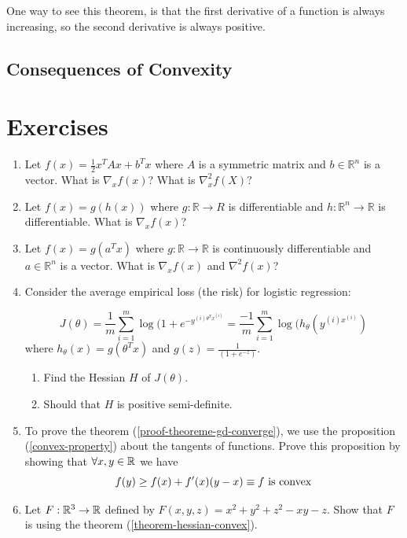 \begin{remark}
    One way to see this theorem, is that the first derivative of a  \cvx{} function is always increasing, so the second derivative is always positive.
\end{remark}


\subsection{Consequences of Convexity}


\section{Exercises}



\begin{enumerate}
    \item Let $f(x) = \frac{1}{2} x^T A x + b^T x$ where $A$ is a symmetric matrix and  $b \in \mathbb R^n$ is a vector. What is $\nabla_x f(x)$? What is $\nabla^2_x f(X)?$
    \item Let $f(x) = g(h(x))$ where $g: \mathbb R \rightarrow R$ is differentiable and $h : \mathbb R^{n} \rightarrow \mathbb R$ is differentiable. What is $\nabla_x f(x)$? 
    \item Let $f(x) = g(a^T x)$ where $g : \mathbb R \rightarrow \mathbb R$ is continuously differentiable and $a \in \mathbb R^n$ is a vector. What is $\nabla_x f(x)$ and $\nabla^2 f(x)$?
    \item Consider the average empirical loss (the risk) for logistic regression: 

    $$J(\theta) = \frac{1}{m} \sum_{i = 1}^m \log(1 + e^{- y^{(i) \theta^T x^{(i)}} } = \frac{-1}{m} \sum_{i = 1}^m \log(h_{\theta}(y^{(i) x^{(i)}})$$
    where $h_{\theta}(x) = g(\theta^T x)$ and $g(z) = \frac{1}{(1 + e^{-z})}$. 
    \begin{enumerate}
    \item Find the Hessian $H$ of $J(\theta)$. 
    \item Should that $H$ is positive semi-definite. 
    \end{enumerate}
        \item To prove the theorem (\ref{proof-theoreme-gd-converge}), we use the proposition (\ref{convex-property}) about the tangents of \cvx{} functions. Prove this proposition by showing that $\forall x,y \in \R$ we have $$f(y) \geq f(x) + f'(x)(y-x) \equiv f \text{ is \cvx}$$
            \item Let $F: \R^3 \to \R$ defined by $F(x,y,z) = x^2 + y^2 + z^2 - xy -z$. Show that $F$ is \cvx{} using the theorem (\ref{theorem-hessian-convex}).
\end{enumerate}

